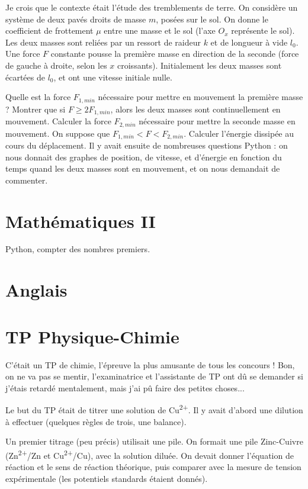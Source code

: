 \documentclass[french,a4paper, 12pt]{article}
\renewcommand{\up}{\textsuperscript}
\begin{document}
Je crois que le contexte était l'étude des tremblements de terre. On considère un système de deux pavés droits de masse $m$, posées sur le sol. On donne le coefficient de frottement $\mu$ entre une masse et le sol (l'axe $O_x$ représente le sol). Les deux masses sont reliées par un ressort de raideur $k$ et de longueur à vide $l_0$. Une force $F$ constante pousse la première masse en direction de la seconde (force de gauche à droite, selon les $x$ croissants). Initialement les deux masses sont écartées de $l_0$, et ont une vitesse initiale nulle.

Quelle est la force $F_{1,min}$ nécessaire pour mettre en mouvement la première masse ? Montrer que si $F \ge 2F_{1, min}$, alors les deux masses sont continuellement en mouvement. Calculer la force $F_{2, min}$ nécessaire pour mettre la seconde masse en mouvement. On suppose que $F_{1, min} < F < F_{2, min}$. Calculer l'énergie dissipée au cours du déplacement. Il y avait ensuite de nombreuses questions Python : on nous donnait des graphes de position, de vitesse, et d'énergie en fonction du temps quand les deux masses sont en mouvement, et on nous demandait de commenter. 



\section*{Mathématiques II}
Python, compter des nombres premiers.
\section*{Anglais}
\section*{TP Physique-Chimie}

C'était un TP de chimie, l'épreuve la plus amusante de tous les concours ! Bon, on ne va pas se mentir, l'examinatrice et l'assistante de TP ont dû se demander si j'étais retardé mentalement, mais j'ai pû faire des petites choses...

Le but du TP était de titrer une solution de Cu\up{2+}. Il y avait d'abord une dilution à effectuer (quelques règles de trois, une balance).

Un premier titrage (peu précis) utilisait une pile. On formait une pile Zinc-Cuivre (Zn\up{2+}/Zn et Cu\up{2+}/Cu), avec la solution diluée. On devait donner l'équation de réaction et le sens de réaction théorique, puis comparer avec la mesure de tension expérimentale (les potentiels standards étaient donnés).
\end{document}

